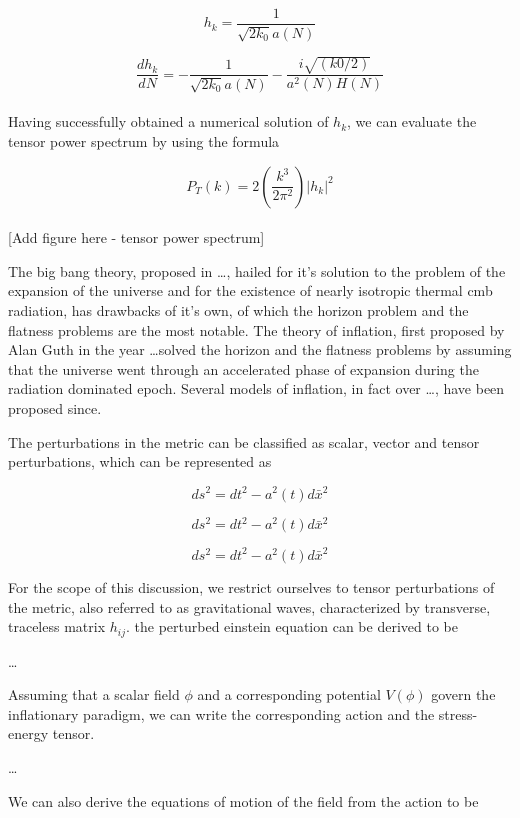 \documentclass[12pt, a4paper]{report}
\begin{document}
$$h_k  = \frac{1}{\sqrt{2k_0}a(N)}$$

$$\frac{dh_k}{dN} = -\frac{1}{\sqrt{2k_0}a(N)} - \frac{i\sqrt{(k0/2)}}{a^2(N)H(N)}$$

\paragraph*{} Having successfully obtained a numerical solution of $h_k$, we can evaluate the tensor power spectrum by using the formula

$$P_T(k) = 2 (\frac{k^3}{2\pi^2}) |h_k|^2$$

\paragraph*{} [Add figure here - tensor power spectrum]

\newpage

The big bang theory, proposed in \ldots, hailed for it's solution to the problem of the expansion of the universe and for the existence of nearly isotropic thermal cmb radiation, has drawbacks of it's own, of which the horizon problem and the flatness problems are the most notable. The theory of inflation, first proposed by Alan Guth in the year \ldots solved the horizon and the flatness problems by assuming that the universe went through an accelerated phase of expansion during the radiation dominated epoch. Several models of inflation, in fact over \ldots, have been proposed since.

The perturbations in the metric can be classified as scalar, vector and tensor perturbations, which can be represented as

$$ds^2 = dt^2 - a^2(t)d\bar{x}^2$$

$$ds^2 = dt^2 - a^2(t)d\bar{x}^2$$

$$ds^2 = dt^2 - a^2(t)d\bar{x}^2$$

For the scope of  this discussion, we restrict ourselves to tensor perturbations of the metric, also referred to as gravitational waves, characterized by transverse, traceless matrix $h_{ij}$. the perturbed einstein equation can be derived to be

\ldots

Assuming that a scalar field $\phi$ and a corresponding potential $V(\phi)$ govern the inflationary paradigm, we can write the corresponding action and the stress-energy tensor.

\ldots

We can also derive the equations of motion of the field from the action to be
\end{document}
